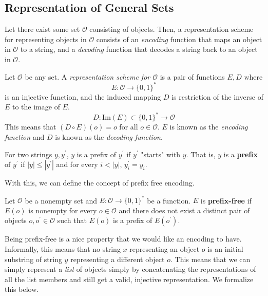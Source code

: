 \subsection{Representation of General Sets}

  Let there exist some set $\mathcal{O}$ consisting of objects. Then, a representation scheme for representing objects in $\mathcal{O}$ consists of an \textit{encoding} function that maps an object in $\mathcal{O}$ to a string, and a \textit{decoding} function that decodes a string back to an object in $\mathcal{O}$. 

  \begin{definition}
  Let $\mathcal{O}$ be any set. A \textit{representation scheme for $\mathcal{O}$} is a pair of functions $E, D$ where 
  \[E: \mathcal{O} \longrightarrow \{0,1\}^\ast\]
  is an injective function, and the induced mapping $D$ is restriction of the inverse of $E$ to the image of $E$. 
  \[D: \mathrm{Im}(E) \subset \{0,1\}^\ast \longrightarrow \mathcal{O}\]
  This means that $(D \circ E) (o) = o$ for all $o \in \mathcal{O}$. $E$ is known as the \textit{encoding function} and $D$ is known as the \textit{decoding function}. 
  \end{definition}

  \begin{definition}[Prefix]
  For two strings $y, y^\prime$, $y$ is a prefix of $y^\prime$ if $y^\prime$ "starts" with $y$. That is, $y$ is a \textbf{prefix} of $y^\prime$ if $|y| \leq |y^\prime|$ and for every $i<|y|$, $y_i^\prime = y_i$. 
  \end{definition}

  With this, we can define the concept of prefix free encoding. 

  \begin{definition}
  Let $\mathcal{O}$ be a nonempty set and $E: \mathcal{O} \longrightarrow \{0,1\}^\ast$ be a function. $E$ is \textbf{prefix-free} if $E(o)$ is nonempty for every $o \in \mathcal{O}$ and there does not exist a distinct pair of objects $o, o^\prime \in \mathcal{O}$ such that $E(o)$ is a prefix of $E(o^\prime)$. 
  \end{definition}

  Being prefix-free is a nice property that we would like an encoding to have. Informally, this means that no string $x$ representing an object $o$ is an initial substring of string $y$ representing a different object $o$. This means that we can simply represent a \textit{list} of objects simply by concatenating the representations of all the list members and still get a valid, injective representation. We formalize this below.

